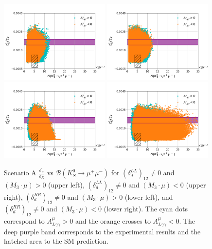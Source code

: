\begin{figure}[h!]
\centering
\includegraphics[width=0.49\textwidth]{figs/figure_2_SCA_LL_pos.png}
\includegraphics[width=0.49\textwidth]{figs/figure_2_SCA_LL_neg.png}\\
\includegraphics[width=0.49\textwidth]{figs/figure_2_SCA_RR_pos.png}
\includegraphics[width=0.49\textwidth]{figs/figure_2_SCA_RR_neg.png}
\caption{\label{fig:eps_SCA} Scenario A $\frac{\varepsilon ^\prime_K}{\varepsilon_K}$ vs $\mathcal{B}(K_S^0\rightarrow\mu^+\mu^-)$ for $\left(\delta_{d}^{LL}\right)_{12}\neq 0$ and $(M_3\cdot\mu)>0$ (upper left), $\left(\delta_{d}^{LL}\right)_{12}\neq 0$ and $(M_3\cdot\mu)<0$ (upper right), $\left(\delta_{d}^{RR}\right)_{12}\neq 0$ and $(M_3\cdot\mu)>0$ (lower left), and $\left(\delta_{d}^{RR}\right)_{12}\neq 0$ and $(M_3\cdot\mu)<0$ (lower right). The cyan dots correspond to $A^\mu_{L\gamma \gamma} > 0$ and the orange crosses to $A^\mu_{L\gamma \gamma} < 0$. The deep purple band corresponds to the experimental results and the hatched area to the SM prediction.}
\end{figure}
